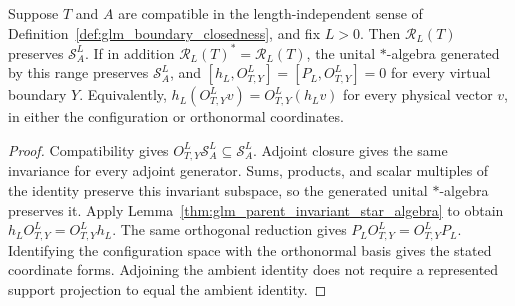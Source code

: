 \begin{lemma}
    \label{thm:glm_boundary_parent_local}
    \leanok
    Suppose $T$ and $A$ are compatible in the length-independent sense of
    Definition~\ref{def:glm_boundary_closedness}, and fix $L>0$.
    Then $\mathcal R_L(T)$ preserves $\mathcal S_A^L$. If in addition
    $\mathcal R_L(T)^*=\mathcal R_L(T)$, the unital $*$-algebra generated
    by this range preserves $\mathcal S_A^L$, and
    $[h_L,O^L_{T,Y}]=[P_L,O^L_{T,Y}]=0$ for every virtual boundary $Y$.
    Equivalently, $h_L(O^L_{T,Y}v)=O^L_{T,Y}(h_Lv)$ for every physical
    vector $v$, in either the configuration or orthonormal coordinates.
\end{lemma}
\begin{proof}
    \leanok
    Compatibility gives $O^L_{T,Y}\mathcal S_A^L\subseteq\mathcal S_A^L$.
    Adjoint closure gives the same invariance for every adjoint generator.
    Sums, products, and scalar multiples of the identity preserve this
    invariant subspace, so the generated unital $*$-algebra preserves it.
    Apply Lemma~\ref{thm:glm_parent_invariant_star_algebra} to obtain
    $h_LO^L_{T,Y}=O^L_{T,Y}h_L$. The same orthogonal reduction gives
    $P_LO^L_{T,Y}=O^L_{T,Y}P_L$. Identifying the configuration space
    with the orthonormal basis gives the stated coordinate forms.
    Adjoining the ambient identity does not require a represented support
    projection to equal the ambient identity.
\end{proof}

